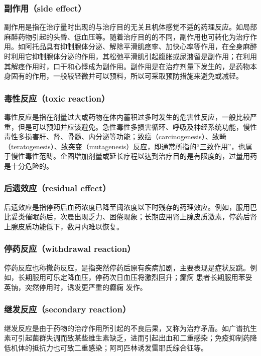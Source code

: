 \subsubsection{副作用（side effect）}

副作用是指在治疗量时出现的与治疗目的无关且机体感觉不适的药理反应。如局部麻醉药物引起的头昏、低血压等。随着治疗目的的不同，副作用也可转化为治疗作用。如阿托品具有抑制腺体分泌、解除平滑肌痉挛、加快心率等作用，在全身麻醉时利用它抑制腺体分泌的作用，其松弛平滑肌引起腹胀或尿潴留是副作用；在利用其解痉作用时，口干和心悸成为副作用。副作用是在治疗剂量下发生的，是药物本身固有的作用，一般较轻微并可以预料，所以可采取预防措施来避免或减轻。

\subsubsection{毒性反应（toxic reaction）}

毒性反应是指在剂量过大或药物在体内蓄积过多时发生的危害性反应，一般比较严重，但是可以预知并应该避免。急性毒性多损害循环、呼吸及神经系统功能，慢性毒性多损害肝、肾、骨髓、内分泌等功能；致癌（carcinogenesis）、致畸（teratogenesis）、致突变（mutagenesis）反应，即通常所指的“三致作用”，也属于慢性毒性范畴。企图增加剂量或延长疗程以达到治疗目的是有限度的，过量用药是十分危险的。

\subsubsection{后遗效应（residual effect）}

后遗效应是指停药后血药浓度已降至阈浓度以下时残存的药理效应。例如，服用巴比妥类催眠药后，次晨出现乏力、困倦现象；长期应用肾上腺皮质激素，停药后肾上腺皮质功能低下，数月内难以恢复。

\subsubsection{停药反应（withdrawal reaction）}

停药反应也称撤药反应，是指突然停药后原有疾病加剧，主要表现是症状反跳。例如，长期服用可乐定降血压，停药次日血压将激烈回升；癫痫
患者长期服用苯妥英钠，突然停用时，诱发更严重的癫痫
发作。

\subsubsection{继发反应（secondary reaction）}

继发反应是由于药物的治疗作用所引起的不良后果，又称为治疗矛盾。如广谱抗生素可引起菌群失调而致某些维生素缺乏，进而引起出血和二重感染；免疫抑制药降低机体的抵抗力也可致二重感染；阿司匹林诱发雷耶氏综合征等。

